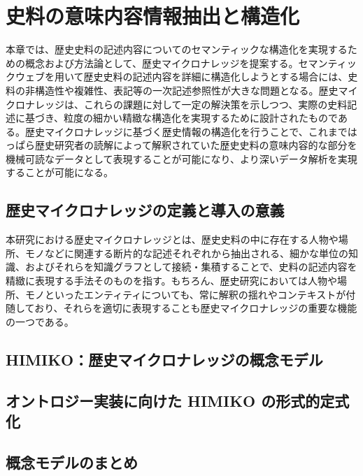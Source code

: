 \chapter{史料の意味内容情報抽出と構造化}
本章では、歴史史料の記述内容についてのセマンティックな構造化を実現するための概念および方法論として、歴史マイクロナレッジを提案する。セマンティックウェブを用いて歴史史料の記述内容を詳細に構造化しようとする場合には、史料の非構造性や複雑性、表記等の一次記述参照性が大きな問題となる。歴史マイクロナレッジは、これらの課題に対して一定の解決策を示しつつ、実際の史料記述に基づき、粒度の細かい精緻な構造化を実現するために設計されたものである。歴史マイクロナレッジに基づく歴史情報の構造化を行うことで、これまではっぱら歴史研究者の読解によって解釈されていた歴史史料の意味内容的な部分を機械可読なデータとして表現することが可能になり、より深いデータ解析を実現することが可能になる。

\section{歴史マイクロナレッジの定義と導入の意義}
本研究における歴史マイクロナレッジとは、歴史史料の中に存在する人物や場所、モノなどに関連する断片的な記述それぞれから抽出される、細かな単位の知識、およびそれらを知識グラフとして接続・集積することで、史料の記述内容を精緻に表現する手法そのものを指す。もちろん、歴史研究においては人物や場所、モノといったエンティティについても、常に解釈の揺れやコンテキストが付随しており、それらを適切に表現することも歴史マイクロナレッジの重要な機能の一つである。


\section{HIMIKO：歴史マイクロナレッジの概念モデル}

\section{オントロジー実装に向けた HIMIKO の形式的定式化}

\section{概念モデルのまとめ}

%

